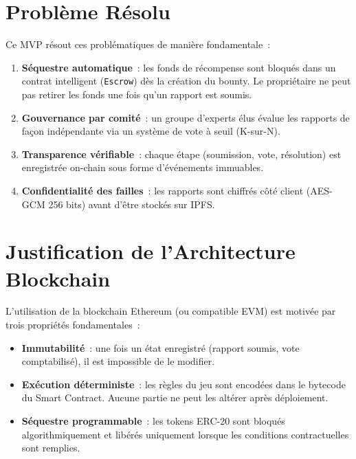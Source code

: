 \documentclass[12pt, a4paper]{report}
\begin{document}
\section{Probl\`{e}me R\'{e}solu}
Ce MVP r\'{e}sout ces probl\'{e}matiques de mani\`{e}re fondamentale~:
\begin{enumerate}
    \item \textbf{S\'{e}questre automatique}~: les fonds de r\'{e}compense sont bloqu\'{e}s dans un contrat intelligent (\texttt{Escrow}) d\`{e}s la cr\'{e}ation du bounty. Le propri\'{e}taire ne peut pas retirer les fonds une fois qu'un rapport est soumis.
    \item \textbf{Gouvernance par comit\'{e}}~: un groupe d'experts \'{e}lus \'{e}value les rapports de fa\c{c}on ind\'{e}pendante via un syst\`{e}me de vote \`{a} seuil (K-sur-N).
    \item \textbf{Transparence v\'{e}rifiable}~: chaque \'{e}tape (soumission, vote, r\'{e}solution) est enregistr\'{e}e on-chain sous forme d'\'{e}v\'{e}nements immuables.
    \item \textbf{Confidentialit\'{e} des failles}~: les rapports sont chiffr\'{e}s c\^{o}t\'{e} client (AES-GCM 256 bits) avant d'\^{e}tre stock\'{e}s sur IPFS.
\end{enumerate}

\section{Justification de l'Architecture Blockchain}
L'utilisation de la blockchain Ethereum (ou compatible EVM) est motiv\'{e}e par trois propri\'{e}t\'{e}s fondamentales~:
\begin{itemize}
    \item \textbf{Immutabilit\'{e}}~: une fois un \'{e}tat enregistr\'{e} (rapport soumis, vote comptabilis\'{e}), il est impossible de le modifier.
    \item \textbf{Ex\'{e}cution d\'{e}terministe}~: les r\`{e}gles du jeu sont encod\'{e}es dans le bytecode du Smart Contract. Aucune partie ne peut les alt\'{e}rer apr\`{e}s d\'{e}ploiement.
    \item \textbf{S\'{e}questre programmable}~: les tokens ERC-20 sont bloqu\'{e}s algorithmiquement et lib\'{e}r\'{e}s uniquement lorsque les conditions contractuelles sont remplies.
\end{itemize}

\end{document}
